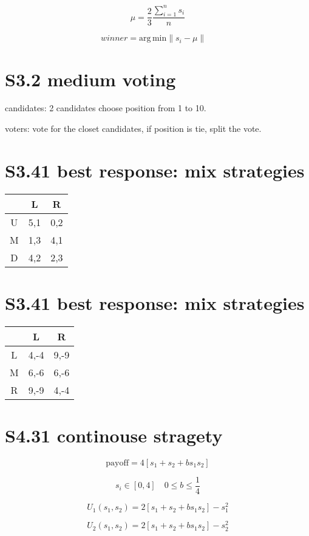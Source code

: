\documentclass[12pt,a4paper]{article}
\begin{document}
\[
\mu = \frac{2}{3}\frac{\sum_{i=1}^{n}s_i}{n}
\]

\[
	winner = \mathrm{arg}\,\mathrm{min}\|s_i-\mu\| \quad 
\]

\section{S3.2 medium voting}
candidates: 2 candidates choose position from 1 to 10.

voters: vote for the closet candidates, if position is tie, split the vote.

\section{S3.41 best response: mix strategies}


\begin{center}
\begin{tabular}{c|cc}
 & L & R \\
 \hline
 U & 5,1 & 0,2 \\
 M & 1,3 & 4,1 \\
 D & 4,2 & 2,3 \\
\end{tabular}
\end{center}


\section{S3.41 best response: mix strategies}
\begin{center}
\begin{tabular}{c|cc}
 & L & R \\
 \hline
 L & 4,-4 & 9,-9 \\
 M & 6,-6 & 6,-6 \\
 R & 9,-9 & 4,-4 \\
\end{tabular}
\end{center}



\section{S4.31 continouse stragety }
\[
\mathrm{payoff} = 4[s_1+s_2+bs_1s_2]
\]

\[
s_i \in [0,4] \quad 0 \leq b \leq \frac{1}{4}
\]

\[
U_1(s_1,s_2) = 2[s_1+s_2+bs_1s_2]-s_1^2
\]

\[
U_2(s_1,s_2) = 2[s_1+s_2+bs_1s_2]-s_2^2
\]
\end{document}
